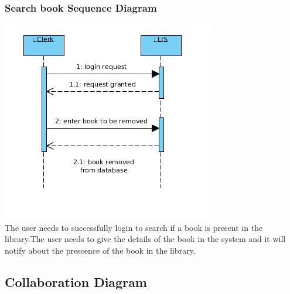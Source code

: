 \documentclass{article}
\begin{document}
\subsubsection*{Search book Sequence Diagram}
\includegraphics[scale=0.50]{images/seqDiagBookRemoval.png}
\\
The user needs to successfully login to search if a book is present in the library.The user needs to give the details of the book in the system and it will notify about the prescence of the book in the library.

\subsection{Collaboration Diagram}
\end{document}
